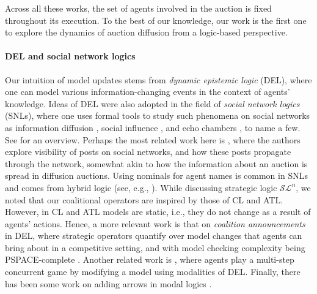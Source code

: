 \documentclass[letterpaper]{article} %
\theoremstyle{definition}
\begin{document}
Across all these works, the set of agents involved in the auction %
is fixed throughout its execution. 
To the best of our knowledge, our work is the first one to explore the dynamics of auction diffusion from a logic-based perspective. %



\paragraph{DEL and social network logics}
Our intuition of model updates stems from \textit{dynamic epistemic logic} (DEL), %
where one can model various information-changing events %
in the context of agents' knowledge. Ideas of DEL were also adopted in the field of \textit{social network logics} (SNLs), where one uses formal tools to study such phenomena on social networks as information diffusion \cite{christoff15,BaltagCRS19}, social influence \cite{ChristoffHP16}, and echo chambers \cite{PedersenSA19}, to name a few. See \cite[Chapter 3]{minathesis} for an overview. Perhaps the most related work here is \cite{galimullinP24}, where the authors explore visibility of posts on social networks, and how these posts propagate through the network, somewhat akin to how the information about an auction is spread in diffusion auctions. Using nominals for agent names is common in SNLs and comes from hybrid logic (see, e.g., \cite{ARECES2007821}). While discussing strategic logic $\mathcal{SL}^n$, we noted that our coalitional operators are inspired by those of CL and ATL. However, in CL and ATL models are static, i.e., they do not change as a result of agents' actions. Hence, a more relevant work is that on \textit{coalition announcements} \cite{agotnes08,galimullin21b,delima14} in DEL, where strategic operators quantify over model changes that agents can bring about in a competitive setting, and with model checking complexity being PSPACE-complete \cite{AlechinaDGW21}. %
Another related work is \cite{MaubertPSS20}, where agents play a multi-step concurrent game by modifying a model using modalities of DEL. Finally, there has been some work on adding arrows in modal logics %
\cite{ArecesFH15}.
\end{document}
